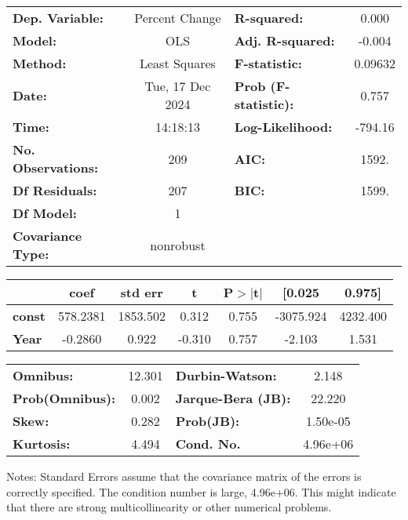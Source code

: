 \begin{center}
\begin{tabular}{lclc}
\toprule
\textbf{Dep. Variable:}    &  Percent Change  & \textbf{  R-squared:         } &     0.000   \\
\textbf{Model:}            &       OLS        & \textbf{  Adj. R-squared:    } &    -0.004   \\
\textbf{Method:}           &  Least Squares   & \textbf{  F-statistic:       } &   0.09632   \\
\textbf{Date:}             & Tue, 17 Dec 2024 & \textbf{  Prob (F-statistic):} &    0.757    \\
\textbf{Time:}             &     14:18:13     & \textbf{  Log-Likelihood:    } &   -794.16   \\
\textbf{No. Observations:} &         209      & \textbf{  AIC:               } &     1592.   \\
\textbf{Df Residuals:}     &         207      & \textbf{  BIC:               } &     1599.   \\
\textbf{Df Model:}         &           1      & \textbf{                     } &             \\
\textbf{Covariance Type:}  &    nonrobust     & \textbf{                     } &             \\
\bottomrule
\end{tabular}
\begin{tabular}{lcccccc}
               & \textbf{coef} & \textbf{std err} & \textbf{t} & \textbf{P$> |$t$|$} & \textbf{[0.025} & \textbf{0.975]}  \\
\midrule
\textbf{const} &     578.2381  &     1853.502     &     0.312  &         0.755        &    -3075.924    &     4232.400     \\
\textbf{Year}  &      -0.2860  &        0.922     &    -0.310  &         0.757        &       -2.103    &        1.531     \\
\bottomrule
\end{tabular}
\begin{tabular}{lclc}
\textbf{Omnibus:}       & 12.301 & \textbf{  Durbin-Watson:     } &    2.148  \\
\textbf{Prob(Omnibus):} &  0.002 & \textbf{  Jarque-Bera (JB):  } &   22.220  \\
\textbf{Skew:}          &  0.282 & \textbf{  Prob(JB):          } & 1.50e-05  \\
\textbf{Kurtosis:}      &  4.494 & \textbf{  Cond. No.          } & 4.96e+06  \\
\bottomrule
\end{tabular}
\end{center}

Notes: \newline
 [1] Standard Errors assume that the covariance matrix of the errors is correctly specified. \newline
 [2] The condition number is large, 4.96e+06. This might indicate that there are \newline
 strong multicollinearity or other numerical problems.
